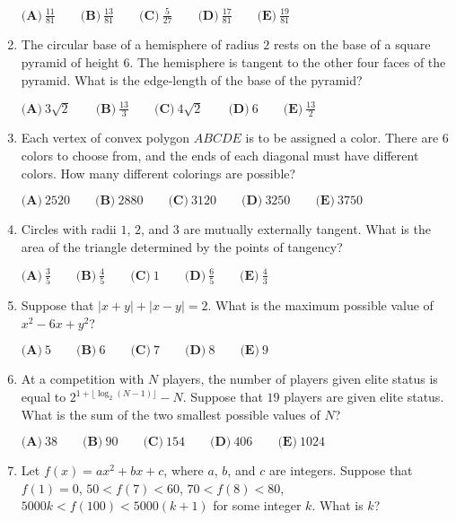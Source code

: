 \documentclass{article}
\begin{document}
\begin{enumerate}[label=\arabic*., itemsep=0.5em]
\(
\textbf{(A)}\ \frac{11}{81} \qquad
\textbf{(B)}\ \frac{13}{81} \qquad
\textbf{(C)}\ \frac{5}{27} \qquad
\textbf{(D)}\ \frac{17}{81} \qquad
\textbf{(E)}\ \frac{19}{81} \)\par \vspace{0.5em}\item The circular base of a hemisphere of radius \(2\) rests on the base of a square pyramid of height \(6\). The hemisphere is tangent to the other four faces of the pyramid. What is the edge-length of the base of the pyramid?

\(
\textbf{(A)}\ 3\sqrt{2} \qquad
\textbf{(B)}\ \frac{13}{3} \qquad
\textbf{(C)}\ 4\sqrt{2} \qquad
\textbf{(D)}\ 6 \qquad
\textbf{(E)}\ \frac{13}{2} \)\par \vspace{0.5em}\item Each vertex of convex polygon \(ABCDE\) is to be assigned a color. There are \(6\) colors to choose from, and the ends of each diagonal must have different colors. How many different colorings are possible?

\(
\textbf{(A)}\ 2520 \qquad
\textbf{(B)}\ 2880 \qquad
\textbf{(C)}\ 3120 \qquad
\textbf{(D)}\ 3250 \qquad
\textbf{(E)}\ 3750 \)\par \vspace{0.5em}\item Circles with radii \(1\), \(2\), and \(3\) are mutually externally tangent. What is the area of the triangle determined by the points of tangency?

\(
\textbf{(A)}\ \frac{3}{5} \qquad
\textbf{(B)}\ \frac{4}{5} \qquad
\textbf{(C)}\ 1 \qquad
\textbf{(D)}\ \frac{6}{5} \qquad
\textbf{(E)}\ \frac{4}{3} \)\par \vspace{0.5em}\item Suppose that \(\left|x+y\right|+\left|x-y\right|=2\). What is the maximum possible value of \(x^2-6x+y^2\)?

\(
\textbf{(A)}\ 5 \qquad
\textbf{(B)}\ 6 \qquad
\textbf{(C)}\ 7 \qquad
\textbf{(D)}\ 8 \qquad
\textbf{(E)}\ 9 \)\par \vspace{0.5em}\item At a competition with \(N\) players, the number of players given elite status is equal to \(2^{1+\lfloor \log_{2} (N-1) \rfloor}-N\). Suppose that \(19\) players are given elite status. What is the sum of the two smallest possible values of \(N\)?

\(
\textbf{(A)}\ 38 \qquad
\textbf{(B)}\ 90 \qquad
\textbf{(C)}\ 154 \qquad
\textbf{(D)}\ 406 \qquad
\textbf{(E)}\ 1024 \)\par \vspace{0.5em}\item Let \(f(x)=ax^2+bx+c\), where \(a\), \(b\), and \(c\) are integers. Suppose that \(f(1)=0\), \(50<f(7)<60\), \(70<f(8)<80\), \(5000k<f(100)<5000(k+1)\) for some integer \(k\). What is \(k\)?


\end{enumerate}
\end{document}

